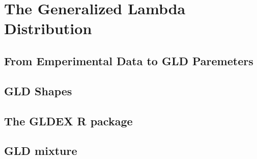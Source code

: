 \chapter[The Generalized Lambda Distribution]{The Generalized Lambda Distribution}\label{cap:gld}

\section{From Emperimental Data to GLD Paremeters}
\cite{Lampasi2006}

\section{GLD Shapes}

\section{The GLDEX R package}

\section{GLD mixture}
